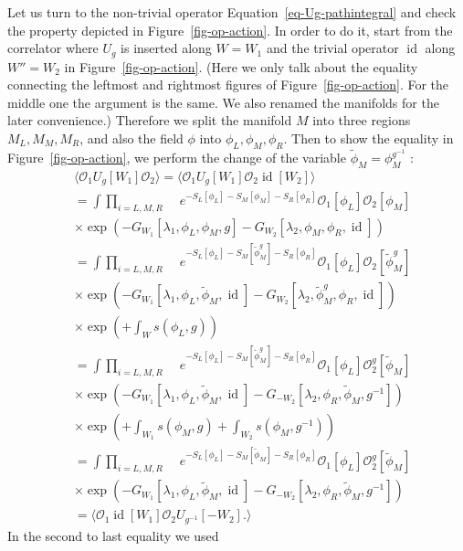\documentclass[
  letterpaper,
  DIV=11,
  numbers=noendperiod]{scrreport}
\DeclareMathOperator{\id}{id}
\begin{document}
Let us turn to the non-trivial operator
Equation~\ref{eq-Ug-pathintegral} and check the property depicted in
Figure~\ref{fig-op-action}. In order to do it, start from the correlator
where \(U_g\) is inserted along \(W=W_1\) and the trivial operator
\(\id\) along \(W''=W_2\) in Figure~\ref{fig-op-action}. (Here we only
talk about the equality connecting the leftmost and rightmost figures of
Figure~\ref{fig-op-action}. For the middle one the argument is the same.
We also renamed the manifolds for the later convenience.) Therefore we
split the manifold \(M\) into three regions \(M_L,M_M,M_R\), and also
the field \(\phi\) into \(\phi_L,\phi_M,\phi_R\). Then to show the
equality in Figure~\ref{fig-op-action}, we perform the change of the
variable \(\widetilde{\phi}_M = \phi_M^{g^{-1}}\) : \[
\begin{align}
    &\langle \mathcal{O}_1 U_g[W_1] \mathcal{O}_2 \rangle = \langle \mathcal{O}_1 U_g[W_1] \mathcal{O}_2 \id[W_2] \rangle \\
     &= \int \prod_{i=L,M,R}\mathop{\mathcal{D}^{M_i}\phi_i} \mathop{\prod_{a=1,2}\mathcal{D}^{W_a} \lambda_a} e^{-S_L[\phi_L]-S_M[\phi_M]-S_R[\phi_R]}\mathcal{O}_1[\phi_L] \mathcal{O}_2[\phi_M]
     \\ 
     &\times \exp\left(-G_{W_1}[\lambda_1,\phi_L,\phi_M,g]-G_{W_2}[\lambda_2,\phi_M,\phi_R,\id]\right)\\
     &= \int \prod_{i=L,M,R}\mathop{\mathcal{D}^{M_i}\phi_i} \mathop{\prod_{a=1,2}\mathcal{D}^{W_a}\lambda_a} e^{-S_L[\phi_L]-S_M[\widetilde\phi_M^g]-S_R[\phi_R]}\mathcal{O}_1[\phi_L] \mathcal{O}_2[\widetilde\phi_M^g]
     \\ 
     &\times \exp\left(-G_{W_1}[\lambda_1,\phi_L,\widetilde\phi_M,\id]-G_{W_2}[\lambda_2,\widetilde{\phi}_M^g,\phi_R,\id]\right)\\ 
     &\times \exp\left( + \int_W s(\phi_L,g) \right)\\ 
     &= \int \prod_{i=L,M,R}\mathop{\mathcal{D}^{M_i}\phi_i} \mathop{\prod_{a=1,2}\mathcal{D}^{W_a}\lambda_a} e^{-S_L[\phi_L]-S_M[\widetilde\phi_M^g]-S_R[\phi_R]}\mathcal{O}_1[\phi_L] \mathcal{O}_2^g[\widetilde\phi_M]
     \\ 
     &\times \exp\left(-G_{W_1}[\lambda_1,\phi_L,\widetilde\phi_M,\id]-G_{-W_2}[\lambda_2,\phi_R,\widetilde{\phi}_M,g^{-1}]\right)\\ 
     &\times \exp\left( + \int_{W_1} s(\phi_M,g) + \int_{W_2} s(\phi_M,g^{-1})  \right)\\
     &= \int \prod_{i=L,M,R}\mathop{\mathcal{D}^{M_i}\phi_i} \mathop{\prod_{a=1,2}\mathcal{D}^{W_a}\lambda_a} e^{-S_L[\phi_L]-S_M[\widetilde\phi_M]-S_R[\phi_R]}\mathcal{O}_1[\phi_L] \mathcal{O}_2^g[\widetilde\phi_M]
     \\ 
     &\times \exp\left(-G_{W_1}[\lambda_1,\phi_L,\widetilde\phi_M,\id]-G_{-W_2}[\lambda_2,\phi_R,\widetilde{\phi}_M,g^{-1}]\right)\\
     &= \langle \mathcal{O}_1 \id[W_1] \mathcal{O}_2 U_{g^{-1}}[-W_2]. \rangle
\end{align}
\] In the second to last equality we used
\end{document}
